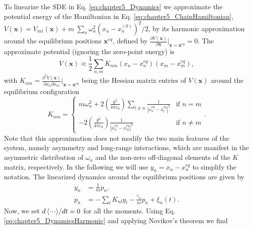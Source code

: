 To linearize the SDE in Eq. \eqref{eq:chapter5_Dynamics} we approximate the potential energy of the Hamiltonian in Eq. \eqref{eq:chapter5_ChainHamiltonian}, $V(\bm{x}) = V_{int}(\bm{x}) + m\;\sum_n \omega_n^2 (x_n-x_n^{(0)})^2/2$, by its harmonic approximation around the equilibrium positions $\bm{x}^{eq}$, defined by  $\frac{\partial V(\bm{x})}{\partial\bm{x}}\Big|_{\bm{x}=\bm{x}^{eq}} = 0$. The approximate potential (ignoring the zero-point energy) is
%
\begin{equation}
    V(\bm{x})\approx  \frac{1}{2} \sum_{n,m} K_{nm} (x_n-x_n^{eq})(x_m-x_m^{eq}),
\end{equation}
%
with $K_{nm} = \frac{\partial^2 V(\bm{x})}{\partial x_n \partial x_m}\Big|_{\bm{x}=\bm{x}^{eq}}$ being the Hessian matrix entries of $V(\bm{x})$ around the equilibrium configuration \cite{James1998}
%
\begin{equation}
    K_{nm} =
    \begin{cases}
        m \omega_n^2 + 2 \left(\frac{q^2}{4\pi\varepsilon_0}\right) \sum_{l \neq n  }\frac{1}{\left|x_n^{eq}-x_l^{eq}\right|^3} & \text{if  } n=m\\

         - 2 \left(\frac{q^2}{4\pi\varepsilon_0}\right) \frac{1}{\left|x_n^{eq}-x_m^{eq}\right|^3} & \text{if  } n \neq m
    \end{cases}.
\end{equation}
%
Note that this approximation does not modify the two main features of the system, namely asymmetry and long-range interactions, which are manifest in the asymmetric distribution of $\omega_n$ and the non-zero off-diagonal elements of the $K$ matrix, respectively. In the following we will use $y_n=x_n-x_n^{eq}$ to simplify the notation. The linearized dynamics around the equilibrium positions are given by
%
\begin{equation}
    \begin{split}
        \dot{y}_n &= \frac{1}{m}p_n,\\
        \dot{p}_n &= -\sum_{l}K_{nl}y_l- \frac{\gamma_n}{m}p_n + \xi_n(t).
    \end{split}
    \label{eq:chapter5_DynamicsHarmonic}
\end{equation}
%
Now, we set ${d\expval{\cdot\!\cdot\!\cdot}}/{dt} = 0$ for all the moments. Using Eq. \eqref{eq:chapter5_DynamicsHarmonic} and applying Novikov's theorem we find


